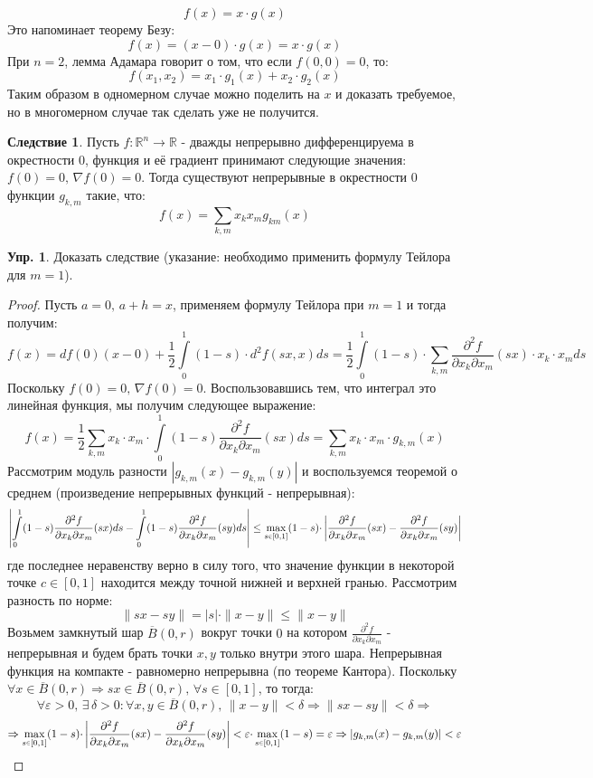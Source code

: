 \documentclass[12pt]{article}
\newcommand{\MR}{\mathbb{R}}
\newcommand{\VE}{\varepsilon}
\theoremstyle{definition}
\newtheorem{exrc}{Упр.}
\newtheorem{corollary}{Следствие}
\newcommand{\ddint}[2]{\displaystyle\int\limits_{#1}^{#2}}
\newcommand{\smallerrel}[1]{\mathrel{\mathpalette\smallerrelaux{#1}}}
\newcommand{\smallerrelaux}[2]{\raisebox{.1ex}{\scalebox{.75}{$#1#2$}}}
\newcommand{\smallin}{\smallerrel{\in}}
\begin{document}
$$
	f(x) = x{\cdot}g(x)
$$ 
Это напоминает теорему Безу: 
$$
	f(x) = (x - 0){\cdot}g(x) = x{\cdot}g(x)
$$ 
При $n = 2$, лемма Адамара говорит о том, что если $f(0,0) = 0$, то: 
$$
	f(x_1,x_2) = x_1{\cdot}g_1(x) + x_2{\cdot}g_2(x)
$$ 
Таким образом в одномерном случае можно поделить на $x$ и доказать требуемое, но в многомерном случае так сделать уже не получится.
\begin{corollary}
	Пусть $f\colon \MR^n \to \MR$ - дважды непрерывно дифференцируема в окрестности $0$, функция и её градиент принимают следующие значения: $f(0) = 0, \, \nabla f(0) = 0$. Тогда существуют непрерывные в окрестности $0$ функции $g_{k,m}$ такие, что:
	$$
		f(x) = \sum\limits_{k,m}x_kx_mg_{km}(x)
	$$
\end{corollary}
\begin{exrc}
	Доказать следствие (указание: необходимо применить формулу Тейлора для $m = 1$).
\end{exrc}
\begin{proof}
	Пусть $a = 0, \, a + h = x$, применяем формулу Тейлора при $m = 1$ и тогда получим:
	$$
		f(x) = df(0)(x-0) + \dfrac{1}{2}\ddint{0}{1}(1-s){\cdot}d^{2}f(sx,x)ds = \dfrac{1}{2}\ddint{0}{1}(1-s){\cdot}\sum\limits_{k,m}\dfrac{\partial^2 f}{\partial x_k \partial x_m}(sx){\cdot}x_k{\cdot}x_m ds 
	$$
	Поскольку $f(0) = 0, \, \nabla f(0) = 0$. Воспользовавшись тем, что интеграл это линейная функция, мы получим следующее выражение:
	$$
		f(x) = \dfrac{1}{2}\sum\limits_{k,m} x_k{\cdot}x_m{\cdot}\ddint{0}{1}(1-s)\dfrac{\partial^2 f}{\partial x_k \partial x_m}(sx) ds = \sum\limits_{k,m}x_k{\cdot}x_m{\cdot}g_{k,m}(x)
	$$
	Рассмотрим модуль разности $|g_{k,m}(x) - g_{k,m}(y)|$ и воспользуемся теоремой о среднем (произведение непрерывных функций - непрерывная):
	$$
		\left|\ddint{0}{1}(1-s)\dfrac{\partial^2 f}{\partial x_k \partial x_m}(sx) ds  - \ddint{0}{1}(1-s)\dfrac{\partial^2 f}{\partial x_k \partial x_m}(sy) ds\right| \leq \max\limits_{s \smallin [0,1]}(1-s){\cdot}\left| \dfrac{\partial^2 f}{\partial x_k \partial x_m}(sx) - \dfrac{\partial^2 f}{\partial x_k \partial x_m}(sy) \right|
	$$
	где последнее неравенству верно в силу того, что значение функции в некоторой точке $c \in [0,1]$ находится между точной нижней и верхней гранью. Рассмотрим разность по норме:
	$$
		\|sx - sy\| = |s|{\cdot}\|x - y\| \leq \|x - y\|
	$$
	Возьмем замкнутый шар $\overline{B}(0,r)$ вокруг точки $0$ на котором $\tfrac{\partial^2 f}{\partial x_k \partial x_m}$ - непрерывная и будем брать точки $x,y$ только внутри этого шара. Непрерывная функция на компакте - равномерно непрерывна (по теореме Кантора). Поскольку $\forall x \in \overline{B}(0,r) \Rightarrow sx \in \overline{B}(0,r), \, \forall s \in [0,1]$, то тогда: 
	$$
		\forall \VE > 0, \, \exists \, \delta > 0 \colon \forall x,y \in \overline{B}(0,r), \, \|x - y\| < \delta \Rightarrow \|sx - sy\| < \delta \Rightarrow
	$$
	$$
		\Rightarrow \max\limits_{s \smallin [0,1]}(1-s){\cdot}\left| \dfrac{\partial^2 f}{\partial x_k \partial x_m}(sx) - \dfrac{\partial^2 f}{\partial x_k \partial x_m}(sy) \right| < \VE {\cdot} \max\limits_{s \smallin [0,1]}(1-s) = \VE \Rightarrow |g_{k,m}(x) - g_{k,m}(y)| < \VE
	$$
\end{proof}
\end{document}
